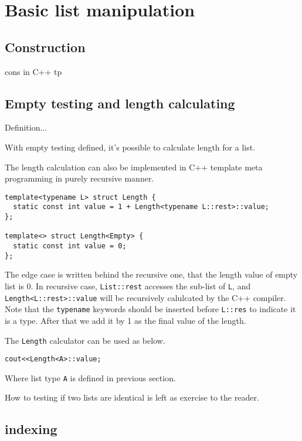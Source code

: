 \documentclass{article}
\begin{document}
\section{Basic list manipulation}

\subsection{Construction}

cons in C++ tp

\subsection{Empty testing and length calculating}

Definition...

With empty testing defined, it's possible to calculate length for a list.

The length calculation can also be implemented in C++ template meta programming in purely recursive
manner.

\lstset{language=C++}
\begin{lstlisting}
template<typename L> struct Length {
  static const int value = 1 + Length<typename L::rest>::value;
};

template<> struct Length<Empty> {
  static const int value = 0;
};
\end{lstlisting}

The edge case is written behind the recursive one, that the length value of empty list is 0.
In recursive case, \verb|List::rest| accesses the sub-list of \verb|L|, and \verb|Length<L::rest>::value|
will be recursively calulcated by the C++ compiler. Note that the \verb|typename| keywords should
be inserted before \verb|L::res| to indicate it is a type. After that we add it by 1 as the final
value of the length.

The \verb|Length| calculator can be used as below.

\begin{lstlisting}
cout<<Length<A>::value;
\end{lstlisting}

Where list type \verb|A| is defined in previous section.

How to testing if two lists are identical is left as exercise to the reader.

\subsection{indexing}
\end{document}
